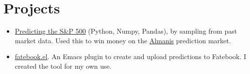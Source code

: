 \documentclass[letterpaper,9pt]{article}
\begin{document}
\section{Projects}


\begin{itemize}
    \item \href{https://sonofhypnos.github.io/blog/prediction/python/2021/01/30/sp500.html}{Predicting the S\&P 500} (Python, Numpy, Pandas), by sampling from past market data. Used this to win money on the \href{https://www.almanisprivate.com/}{Almanis} prediction market.
    \item \href{https://github.com/sonofhypnos/fatebook.el}{fatebook.el}. An Emacs plugin to create and upload predictions to Fatebook. I created the tool for my own use.
\end{itemize}
\end{document}
